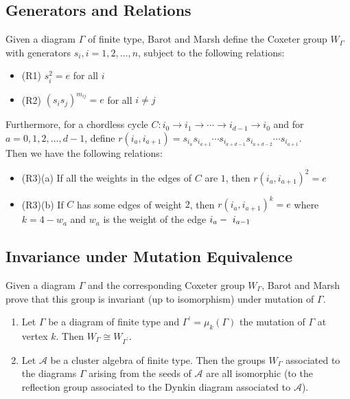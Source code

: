 \documentclass{beamer}
\begin{document}
\subsection{Generators and Relations}

\begin{frame}

Given a diagram $\Gamma$ of finite type, Barot and Marsh define the Coxeter group $W_{\Gamma}$ with generators $s_i, i = 1,2,\ldots, n$, subject to the following relations:
\begin{block}
   
\begin{itemize}
\item{\alert{(R1)}} $s_i^2 = e$ for all $i$
\item{\alert{(R2)}} $\left(s_is_j\right)^{m_{ij}} = e$ for all $i \neq j$
\end{itemize}

Furthermore, for a chordless cycle $C : i_0 \rightarrow i_1 \rightarrow \cdots \rightarrow i_{d-1} \rightarrow i_0$ and for $a = 0,1,2,\ldots, d-1$, define \textbf{$r\left(i_a, i_{a+1}\right) = s_{i_a}s_{i_{a+1}} \cdots s_{i_{a+d-1}}s_{i_{a+d-2}} \cdots s_{i_{a+1}}$}.\\

\vspace{0.1cm}
Then we have the following relations:
\begin{itemize}
\item{\alert{(R3)(a)}} If all the weights in the edges of $C$ are $1$, then $r(i_a, i_{a+1})^2 = e$
\item{\alert{(R3)(b)}} If $C$ has some edges of weight $2$, then $r(i_a, i_{a+1})^k = e$ where $k = 4-w_a$ and $w_a$ is the weight of the edge $i_a\--\ i_{a-1}$
\end{itemize}
\end{block}
\end{frame}


\subsection{Invariance under Mutation Equivalence}

\begin{frame}
Given a diagram $\Gamma$ and the corresponding Coxeter group $W_{\Gamma}$, Barot and Marsh prove that this group is invariant (up to isomorphism) under mutation of $\Gamma$.

\begin{theorem}
\begin{enumerate}
\item Let $\Gamma$ be a diagram of finite type and $\Gamma^{\prime} = \mu_k(\Gamma)$ the mutation of $\Gamma$ at vertex $k$. Then $W_{\Gamma} \cong W_{\Gamma^{\prime}}$.
\item Let $\mathscr{A}$ be a cluster algebra of finite type. Then the groups $W_{\Gamma}$ associated to the diagrams $\Gamma$ arising from the seeds of $\mathscr{A}$ are all isomorphic (to the reflection group associated to the Dynkin diagram associated to $\mathscr{A}$).
\end{enumerate}
\end{theorem}
\end{frame}
\end{document}
